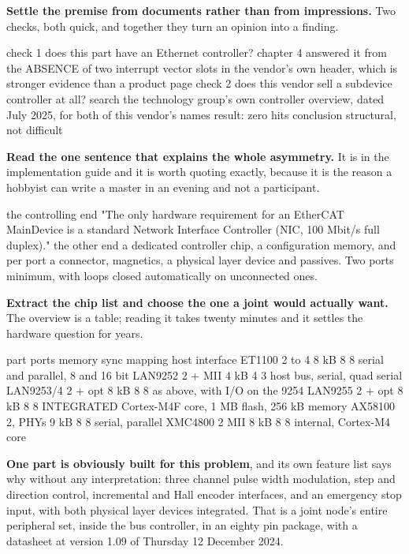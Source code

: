\begin{steps}
\item \textbf{Settle the premise from documents rather than from impressions.}
Two checks, both quick, and together they turn an opinion into a finding.
\begin{plaincode}
check 1   does this part have an Ethernet controller?
          chapter 4 answered it from the ABSENCE of two interrupt vector
          slots in the vendor's own header, which is stronger evidence
          than a product page
check 2   does this vendor sell a subdevice controller at all?
          search the technology group's own controller overview, dated
          July 2025, for both of this vendor's names
          result: zero hits
conclusion  structural, not difficult
\end{plaincode}

\item \textbf{Read the one sentence that explains the whole asymmetry.} It is in
the implementation guide and it is worth quoting exactly, because it is the
reason a hobbyist can write a master in an evening and not a participant.
\begin{plaincode}
the controlling end   "The only hardware requirement for an EtherCAT
                      MainDevice is a standard Network Interface Controller
                      (NIC, 100 Mbit/s full duplex)."
the other end         a dedicated controller chip, a configuration memory,
                      and per port a connector, magnetics, a physical layer
                      device and passives. Two ports minimum, with loops
                      closed automatically on unconnected ones.
\end{plaincode}

\item \textbf{Extract the chip list and choose the one a joint would actually
want.} The overview is a table; reading it takes twenty minutes and it settles
the hardware question for years.
\begin{plaincode}
part       ports  memory  sync  mapping  host interface
ET1100     2 to 4   8 kB     8      8    serial and parallel, 8 and 16 bit
LAN9252    2 + MII  4 kB     4      3    host bus, serial, quad serial
LAN9253/4  2 + opt  8 kB     8      8    as above, with I/O on the 9254
LAN9255    2 + opt  8 kB     8      8    INTEGRATED Cortex-M4F core,
                                         1 MB flash, 256 kB memory
AX58100    2, PHYs  9 kB     8      8    serial, parallel
XMC4800    2 MII    8 kB     8      8    internal, Cortex-M4 core
\end{plaincode}
\textbf{One part is obviously built for this problem}, and its own feature list
says why without any interpretation: three channel pulse width modulation, step
and direction control, incremental and Hall encoder interfaces, and an emergency
stop input, with both physical layer devices integrated. That is a joint node's
entire peripheral set, inside the bus controller, in an eighty pin package, with
a datasheet at version 1.09 of Thursday 12 December 2024.


\end{steps}
